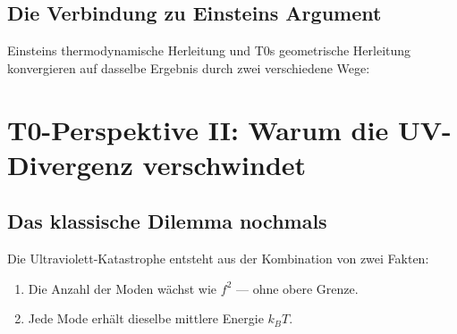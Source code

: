 \subsection{Die Verbindung zu Einsteins Argument}

Einsteins thermodynamische Herleitung und T0s geometrische Herleitung konvergieren 
auf dasselbe Ergebnis durch zwei verschiedene Wege:

\begin{table}[h]
    \centering
    \caption{Zwei Wege zur Gleichung $\epsilon = hf$}
    \label{tab:two_ways}
\end{table}

\clearpage

\section{T0-Perspektive II: Warum die UV-Divergenz verschwindet}
\label{sec:t0_uv}

\subsection{Das klassische Dilemma nochmals}

Die Ultraviolett-Katastrophe entsteht aus der Kombination von zwei Fakten:
\begin{enumerate}
    \item Die Anzahl der Moden wächst wie $f^2$ — ohne obere Grenze.
    \item Jede Mode erhält dieselbe mittlere Energie $k_BT$.
\end{enumerate}

